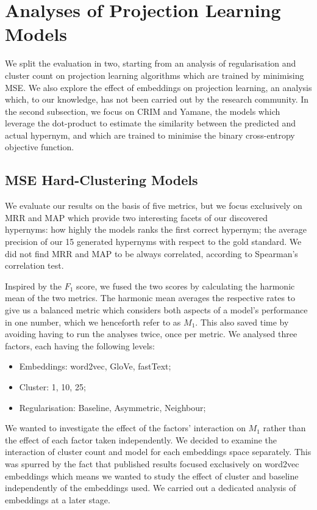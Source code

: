 \section{Analyses of Projection Learning Models}
We split the evaluation in two, starting from an analysis of regularisation and cluster count on projection learning algorithms which are trained by minimising \ac{MSE}.  We also explore the effect of embeddings on projection learning, an analysis which, to our knowledge, has not been carried out by the research community.  In the second subsection, we focus on CRIM and Yamane, the models which leverage the dot-product to estimate the similarity between the predicted and actual hypernym, and which are trained to minimise the binary cross-entropy objective function.

\subsection{MSE Hard-Clustering Models}
We evaluate our results on the basis of five metrics, but we focus exclusively on \ac{MRR} and \ac{MAP} which provide two interesting facets of our discovered hypernyms: how highly the models ranks  the first correct hypernym; the average precision of our 15 generated hypernyms with respect to the gold standard.  We did not find \ac{MRR} and \ac{MAP} to be always correlated, according to Spearman's correlation test.

Inspired by the $F_1$ score, we fused the two scores by calculating the harmonic mean of the two metrics.  The harmonic mean averages the respective rates to give us a balanced metric which considers both aspects of a model's performance in one number, which we henceforth refer to as $M_1$.  This also saved time by avoiding having to run the analyses twice, once per metric.  We analysed three factors, each having the following levels:
\begin{itemize}
    \item Embeddings: word2vec, GloVe, fastText;
    \item Cluster: 1, 10, 25;
    \item Regularisation: Baseline, Asymmetric, Neighbour;
\end{itemize}

We wanted to investigate the effect of the factors' interaction on $M_1$ rather than the effect of each factor taken independently.  We decided to examine the interaction of cluster count and model for each embeddings space separately.  This was spurred by the fact that published results focused exclusively on word2vec embeddings which means we wanted to study the effect of cluster and baseline independently of the embeddings used.  We carried out a dedicated analysis of embeddings at a later stage.  

